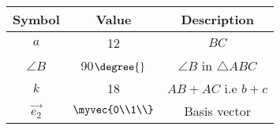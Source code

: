 \begin{tabular}{|c|c|c|}
  \hline
  \textbf{Symbol}&\textbf{Value}&\textbf{Description}\\
  \hline
  $a$ & 12 & $BC$\\
  \hline
	$\angle{B}$ & 90$\degree{}$ & $\angle{B}$ in $\triangle ABC$ \\
  \hline
  $k$ & 18 & $AB+AC$ i.e $b+c$ \\
  \hline 
  $\vec{e_2}$ & $\myvec{0\\1\\}$ & Basis vector\\
  \hline   
\end{tabular}\\
